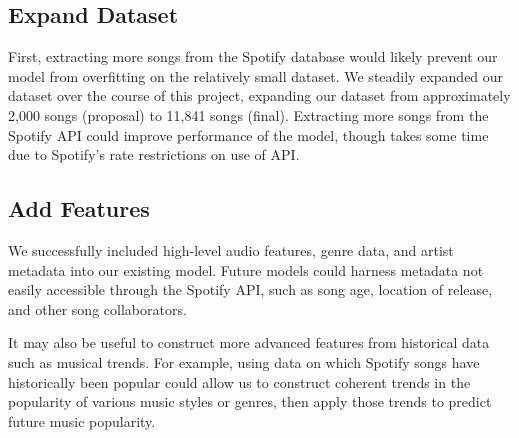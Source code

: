 \documentclass[journal]{IEEEtran}
\begin{document}
\subsection{Expand Dataset}
First, extracting more songs from the Spotify database would likely prevent our model from overfitting on the relatively small dataset. We steadily expanded our dataset over the course of this project, expanding our dataset from approximately 2,000 songs (proposal) to 11,841 songs (final). Extracting more songs from the Spotify API could improve performance of the model, though takes some time due to Spotify's rate restrictions on use of API.

\subsection{Add Features}
We successfully included high-level audio features, genre data, and artist metadata into our existing model. Future models could harness metadata not easily accessible through the Spotify API, such as song age, location of release, and other song collaborators.

It may also be useful to construct more advanced features from historical data such as musical trends. For example, using data on which Spotify songs have historically been popular could allow us to construct coherent trends in the popularity of various music styles or genres, then apply those trends to predict future music popularity.


%
%
%


\end{document}
